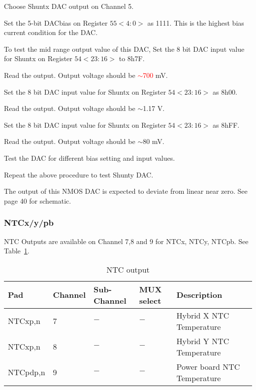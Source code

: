 \documentclass[11pt]{article}   			%
\newcommand\todo[1]{\textcolor{red}{#1}}
\begin{document}
\begin{compactitem}
    \item{Choose Shuntx DAC output on Channel 5.}
    \item{Set the 5-bit DACbias on Register $55<4:0>$ as 1111. This is the highest bias current condition for the DAC.}
    \item{To test the mid range output value of this DAC, Set the 8 bit DAC input value for Shuntx on Register $54<23:16>$ to 8h7F}.
    \item{Read the output. Output voltage should be \todo{$\sim$700} mV.}
    \item{Set the 8 bit DAC input value for  Shuntx  on Register $54<23:16>$ as 8h00.}
    \item{Read the output. Output voltage should be $\sim$1.17 V.}
    \item{Set the 8 bit DAC input value for Shuntx  on Register $54<23:16>$ as 8hFF.}
    \item{Read the output. Output voltage should be $\sim$80 mV.}
    \item{Test the DAC for different bias setting and input values.}
    \item{Repeat the above procedure to test Shunty DAC.}
\end{compactitem}
The output of this NMOS DAC is expected to deviate from linear near zero. See \cite{amacv2schem} page 40 for schematic.

\subsubsection{NTCx/y/pb}
NTC Outputs are available on Channel 7,8 and 9 for NTCx, NTCy, NTCpb. See Table~\ref{tab:ntc}.
\begin{table}[h]
  \begin{center}
\begin{tabular}{|l|l|l|l|l|l|}
\hline
{\bf Pad} & {\bf Channel} & {\bf Sub-Channel} & {\bf MUX select} & {\bf Description}\\
\hline
NTCxp,n & 7 & $-$ & $-$ & Hybrid X NTC Temperature\\
\hline
NTCxp,n & 8 & $-$ & $-$ & Hybrid Y NTC Temperature\\
\hline
NTCpdp,n & 9 & $-$ & $-$ & Power board NTC Temperature\\
\hline
\end{tabular}
\caption{NTC output}
\label{tab:ntc}
\end{center}
\end{table}
\end{document}

